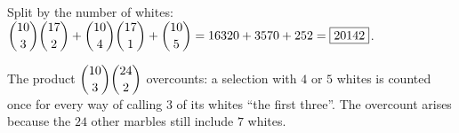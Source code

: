 Split by the number of whites: $\dbinom{10}3\dbinom{17}2+\dbinom{10}4\dbinom{17}1+\dbinom{10}5=16320+3570+252=\boxed{20142}$.

The product $\dbinom{10}3\dbinom{24}2$ overcounts: a selection with $4$ or $5$ whites is counted once for every way of calling $3$ of its whites ``the first three''. The overcount arises because the $24$ other marbles still include $7$ whites.
